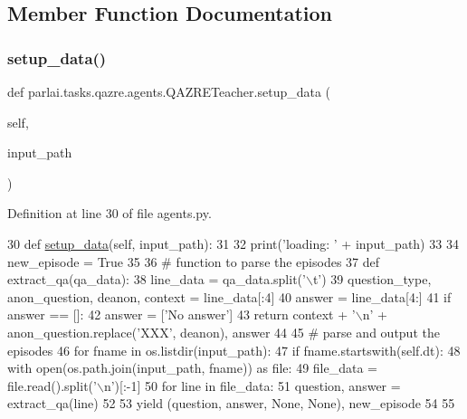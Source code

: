 \subsection{Member Function Documentation}
\mbox{\label{classparlai_1_1tasks_1_1qazre_1_1agents_1_1QAZRETeacher_a483aac0ab1257b808f13ba4f8bc456da}} 
\subsubsection{\texorpdfstring{setup\+\_\+data()}{setup\_data()}}
{\footnotesize\ttfamily def parlai.\+tasks.\+qazre.\+agents.\+Q\+A\+Z\+R\+E\+Teacher.\+setup\+\_\+data (\begin{DoxyParamCaption}\item[{}]{self,  }\item[{}]{input\+\_\+path }\end{DoxyParamCaption})}



Definition at line 30 of file agents.\+py.


\begin{DoxyCode}
30     \textcolor{keyword}{def }\hyperlink{namespaceparlai_1_1tasks_1_1multinli_1_1agents_a4fa2cb0ba1ed745336ad8bceed36b841}{setup\_data}(self, input\_path):
31 
32         print(\textcolor{stringliteral}{'loading: '} + input\_path)
33 
34         new\_episode = \textcolor{keyword}{True}
35 
36         \textcolor{comment}{# function to parse the episodes}
37         \textcolor{keyword}{def }extract\_qa(qa\_data):
38             line\_data = qa\_data.split(\textcolor{stringliteral}{'\(\backslash\)t'})
39             question\_type, anon\_question, deanon, context = line\_data[:4]
40             answer = line\_data[4:]
41             \textcolor{keywordflow}{if} answer == []:
42                 answer = [\textcolor{stringliteral}{'No answer'}]
43             \textcolor{keywordflow}{return} context + \textcolor{stringliteral}{'\(\backslash\)n'} + anon\_question.replace(\textcolor{stringliteral}{'XXX'}, deanon), answer
44 
45         \textcolor{comment}{# parse and output the episodes}
46         \textcolor{keywordflow}{for} fname \textcolor{keywordflow}{in} os.listdir(input\_path):
47             \textcolor{keywordflow}{if} fname.startswith(self.dt):
48                 with open(os.path.join(input\_path, fname)) \textcolor{keyword}{as} file:
49                     file\_data = file.read().split(\textcolor{stringliteral}{'\(\backslash\)n'})[:-1]
50                 \textcolor{keywordflow}{for} line \textcolor{keywordflow}{in} file\_data:
51                     question, answer = extract\_qa(line)
52 
53                     \textcolor{keywordflow}{yield} (question, answer, \textcolor{keywordtype}{None}, \textcolor{keywordtype}{None}), new\_episode
54 
55 
\end{DoxyCode}


